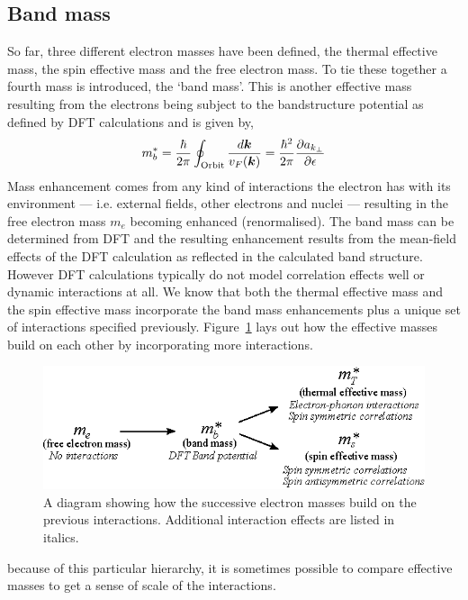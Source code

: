 \subsection{Band mass}

So far, three different electron masses have been defined, the thermal effective mass, the spin effective mass and the free electron mass. To tie these together a fourth mass is introduced, the `band mass'. This is another effective mass resulting from the electrons being subject to the bandstructure potential as defined by \ac{DFT} calculations and is given by,
\begin{equation}
    \label{Eqn:Theo:BandMass}
  m^*_b = \frac{\hbar}{2\pi} \oint_{\textrm{Orbit}} \frac{d\boldsymbol{k}}{v_F(\boldsymbol{k})} = \frac{\hbar^2}{2\pi}\frac{\partial a_{k_\perp}}{\partial \epsilon}
\end{equation}
Mass enhancement comes from any kind of interactions the electron has with its environment --- i.e. external fields, other electrons and nuclei --- resulting in the free electron mass $m_e$ becoming enhanced (renormalised). The band mass can be determined from \ac{DFT} and the resulting enhancement results from the mean-field effects of the \ac{DFT} calculation as reflected in the calculated band structure. However \ac{DFT} calculations typically do not model correlation effects well or dynamic interactions at all. We know that both the thermal effective mass and the spin effective mass incorporate the band mass enhancements plus a unique set of interactions specified previously. Figure~\ref{Fig:Theo:EffectiveMassInheritance} lays out how the effective masses build on each other by incorporating more interactions.
\begin{figure}[htbp]
    \begin{center}
        \includegraphics[scale=0.9]{Chapter-Theory/Figures/EffectiveMassInheritance/EffectiveMassInheritance}
        \caption{A diagram showing how the successive electron masses build on the previous interactions. Additional interaction effects are listed in italics.}
        \label{Fig:Theo:EffectiveMassInheritance}
    \end{center}
\end{figure}
because of this particular hierarchy, it is sometimes possible to compare effective masses to get a sense of scale of the interactions.

